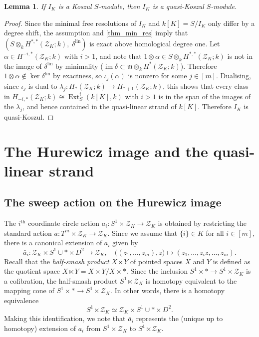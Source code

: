 \documentclass[a4paper,10pt]{amsart}
\newtheorem{lemma}[theorem]{Lemma}
\theoremstyle{definition}
\theoremstyle{remark}
\DeclareMathOperator{\Ext}{Ext}
\begin{document}
\begin{lemma} \label{lem_Kos_qKos}
If $I_K$ is a Koszul $S$-module, then $I_K$ is a quasi-Koszul $S$-module.
\end{lemma}

\begin{proof}
Since the minimal free resolutions of $I_K$ and $k[K]=S/I_K$ only differ by a degree shift, the assumption and \cref{thm_min_res} imply that $\left(S\otimes_k H^{*,*}(\mathcal{Z}_K;k),\; \delta^\mathrm{lin}\right)$ is exact above homological degree one.  Let $\alpha \in H^{-i,*}(\mathcal{Z}_K;k)$ with $i>1$, and note that $1\otimes\alpha \in S\otimes_k H^{*,*}(\mathcal{Z}_K;k)$ is not in the image of $\delta^\mathrm{lin}$ by minimality ($\operatorname{im}\delta\subset \mathfrak{m}\otimes_k H^*(\mathcal{Z}_K;k)$). Therefore $1\otimes\alpha \notin \ker\delta^\mathrm{lin}$ by exactness, so $\iota_j(\alpha)$ is nonzero for some $j\in[m]$. Dualising, since $\iota_j$ is dual to $\lambda_j\colon H_*(\mathcal{Z}_K;k)\to H_{*+1}(\mathcal{Z}_K;k)$, this shows that every class in $H_{-i,*}(\mathcal{Z}_K;k) \cong \Ext_S^i(k[K],k)$ with $i>1$ is in the span of the images of the $\lambda_j$, and hence contained in the quasi-linear strand of $k[K]$. Therefore $I_K$ is quasi-Koszul.
\end{proof}



\section{The Hurewicz image and the quasi-linear strand} \label{sec_hurewicz}

\subsection*{The sweep action on the Hurewicz image}

The $i^\text{th}$ coordinate circle action $a_i\colon S^1\times \mathcal{Z}_K \to \mathcal{Z}_K$ is obtained by restricting the standard action $a\colon T^m\times\mathcal{Z}_K\to\mathcal{Z}_K$. Since we assume that $\{i\}\in K$ for all $i\in[m]$, there is a  canonical extension of $a_i$ given by
\[
\bar{a}_i\colon \mathcal{Z}_K\times S^1 \cup *\times D^2 \longrightarrow \mathcal{Z}_K, \quad \big((z_1,\ldots,z_m),z\big) \mapsto (z_1,\ldots,z_iz,\ldots,z_m). 
\]
Recall that the \emph{half-smash product} $X\ltimes Y$ of pointed spaces $X$ and $Y$ is defined as the quotient space $ X\ltimes Y = {X\times Y}/{X\times *}$. Since the inclusion $S^1\times * \to S^1\times\mathcal{Z}_K$ is a cofibration,  the half-smash product $S^1\ltimes\mathcal{Z}_K$ is homotopy equivalent to the mapping cone of $S^1\times * \to S^1\times\mathcal{Z}_K$. In other words, there is a homotopy equivalence
\[
S^1\ltimes\mathcal{Z}_K\simeq \mathcal{Z}_K\times S^1 \cup *\times D^2.
\]
Making this identification, we note that $\bar{a}_i$ represents the (unique up to homotopy) extension of $a_i$ from $S^1\times\mathcal{Z}_K$ to $S^1\ltimes\mathcal{Z}_K$.
\end{document}

